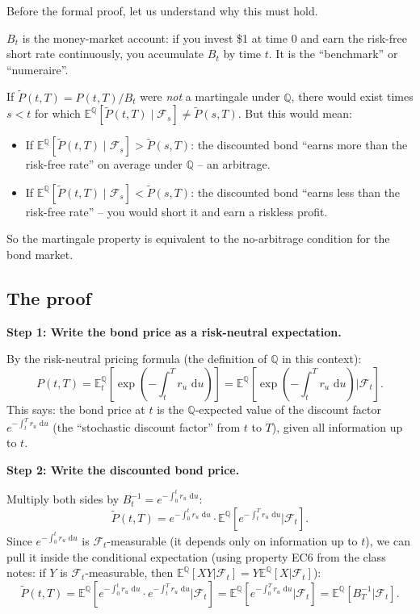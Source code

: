 \documentclass[11pt]{article}
\newcommand{\QQ}{\mathbb{Q}}
\newcommand{\EE}{\mathbb{E}}
\newcommand{\FF}{\mathcal{F}}
\newcommand{\dd}{\,\mathrm{d}}
\begin{document}
Before the formal proof, let us understand why this must hold.

$B_t$ is the money-market account: if you invest \$1 at time 0 and earn the
risk-free short rate continuously, you accumulate $B_t$ by time $t$.  It is
the ``benchmark'' or ``numeraire''.

If $\widetilde{P}(t,T) = P(t,T)/B_t$ were \emph{not} a martingale under
$\QQ$, there would exist times $s < t$ for which $\EE^\QQ[\widetilde{P}(t,T)
\mid \FF_s] \ne \widetilde{P}(s,T)$.  But this would mean:
\begin{itemize}
  \item If $\EE^\QQ[\widetilde{P}(t,T)\mid\FF_s] > \widetilde{P}(s,T)$:
  the discounted bond ``earns more than the risk-free rate'' on average
  under $\QQ$ -- an arbitrage.
  \item If $\EE^\QQ[\widetilde{P}(t,T)\mid\FF_s] < \widetilde{P}(s,T)$:
  the discounted bond ``earns less than the risk-free rate'' -- you would
  short it and earn a riskless profit.
\end{itemize}
So the martingale property is equivalent to the no-arbitrage condition
for the bond market.

\subsection{The proof}

\textbf{Step 1: Write the bond price as a risk-neutral expectation.}

By the risk-neutral pricing formula (the definition of $\QQ$ in this
context):
\[
P(t,T) = \EE_t^\QQ\!\left[\exp\!\left(-\int_t^T r_u\,\dd u\right)\right]
= \EE^\QQ\!\left[\exp\!\left(-\int_t^T r_u\,\dd u\right)\bigg|\FF_t\right].
\]
This says: the bond price at $t$ is the $\QQ$-expected value of the
discount factor $e^{-\int_t^T r_u\,\dd u}$ (the ``stochastic discount
factor'' from $t$ to $T$), given all information up to $t$.

\textbf{Step 2: Write the discounted bond price.}

Multiply both sides by $B_t^{-1} = e^{-\int_0^t r_u\,\dd u}$:
\[
\widetilde{P}(t,T)
= e^{-\int_0^t r_u\,\dd u}\cdot\EE^\QQ\!\left[e^{-\int_t^T r_u\,\dd u}\bigg|\FF_t\right].
\]
Since $e^{-\int_0^t r_u\,\dd u}$ is $\FF_t$-measurable (it depends only
on information up to $t$), we can pull it inside the conditional expectation
(using property EC6 from the class notes: if $Y$ is $\FF_t$-measurable,
then $\EE^\QQ[XY|\FF_t] = Y\EE^\QQ[X|\FF_t]$):
\[
\widetilde{P}(t,T)
= \EE^\QQ\!\left[e^{-\int_0^t r_u\,\dd u}\cdot e^{-\int_t^T r_u\,\dd u}\bigg|\FF_t\right]
= \EE^\QQ\!\left[e^{-\int_0^T r_u\,\dd u}\bigg|\FF_t\right]
= \EE^\QQ\!\left[B_T^{-1}\bigg|\FF_t\right].
\]
\end{document}
